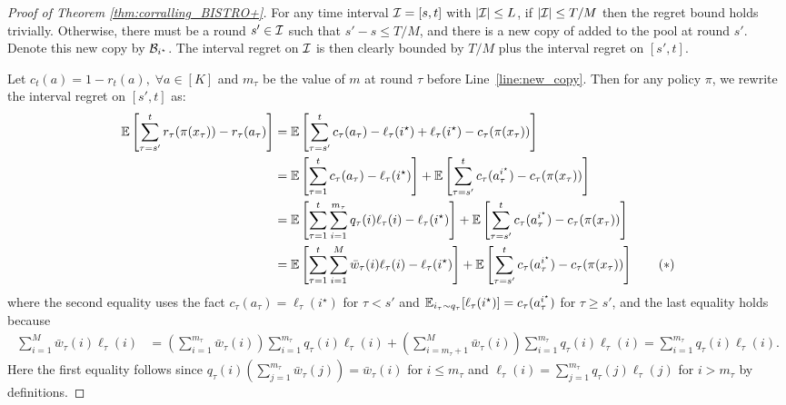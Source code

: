 \begin{proof}[Proof of Theorem \ref{thm:corralling_BISTRO+}]
For any time interval ${\mathcal{I}} = [s, t]$ with $|{\mathcal{I}}| \leq L$, if $|{\mathcal{I}}| \leq T/M$ then the regret bound holds trivially.
Otherwise, there must be a round $s' \in {\mathcal{I}}$ such that $s' - s \leq T/M$,
and there is a new copy of \bistro added to the pool at round $s'$.
Denote this new copy by ${{\cal{B}}_{i^\star}}$.
The interval regret on ${\mathcal{I}}$ is then clearly bounded by $T/M$ plus the interval regret on $[s', t]$.

Let $c_t(a) = 1 - r_t(a), \;\forall a\in [K]$ and $m_\tau$ be the value of $m$ at round $\tau$ before Line~\ref{line:new_copy}.
Then for any policy $\pi$, we rewrite the interval regret on $[s', t]$ as:
\begin{align*}
\mathbb{E}\left[ \sum_{\tau = s'}^t r_\tau(\pi(x_\tau)) - r_\tau(a_\tau) \right] 
&= \mathbb{E}\left[ \sum_{\tau = s'}^t c_\tau(a_\tau) -\ell_\tau(i^\star) + \ell_\tau(i^\star) - c_\tau(\pi(x_\tau))  \right]  \\
&= \mathbb{E}\left[ \sum_{\tau = 1}^t c_\tau(a_\tau) -\ell_\tau(i^\star) \right] + \mathbb{E}\left[\sum_{\tau = s'}^t c_\tau(a_\tau^{i^\star}) - c_\tau(\pi(x_\tau))  \right]  \\
&= \mathbb{E}\left[ \sum_{\tau = 1}^t \sum_{i=1}^{m_\tau} q_\tau(i) \ell_\tau(i) -\ell_\tau(i^\star) \right] + \mathbb{E}\left[\sum_{\tau = s'}^t c_\tau(a_\tau^{i^\star}) - c_\tau(\pi(x_\tau))  \right]  \\
&= \mathbb{E}\left[ \sum_{\tau = 1}^t \sum_{i=1}^{M} \bar{w}_\tau(i) \ell_\tau(i) -\ell_\tau(i^\star) \right] + \mathbb{E}\left[\sum_{\tau = s'}^t c_\tau(a_\tau^{i^\star}) - c_\tau(\pi(x_\tau))  \right]  \tag{$*$}
\end{align*}
where the second equality uses the fact $c_\tau(a_\tau) = \ell_\tau(i^\star)$ for $\tau < s'$ 
and $\mathbb{E}_{i_\tau \sim q_\tau}[\ell_\tau(i^\star) ] = c_\tau(a_\tau^{i^\star})$ for $\tau \geq s'$,
and the last equality holds because
\begin{align*}
\sum_{i=1}^{M} \bar{w}_\tau(i) \ell_\tau(i) &= 
\left(\sum_{i=1}^{m_\tau} \bar{w}_\tau(i)  \right)  \sum_{i=1}^{m_\tau} q_\tau(i) \ell_\tau(i) + 
\left(\sum_{i=m_\tau+1}^{M} \bar{w}_\tau(i) \right)  \sum_{i=1}^{m_\tau} q_\tau(i) \ell_\tau(i) 
= \sum_{i=1}^{m_\tau} q_\tau(i) \ell_\tau(i).
\end{align*}
Here the first equality follows since $q_\tau(i)\left(\sum_{j=1}^{m_\tau}
\bar{w}_\tau(j) \right) = \bar{w}_\tau(i)$ for $i \leq m_\tau$ and
$\ell_\tau(i) = \sum_{j=1}^{m_\tau} q_\tau(j) \ell_\tau(j) $ for $i >
m_\tau$ by definitions.  


\end{proof}
